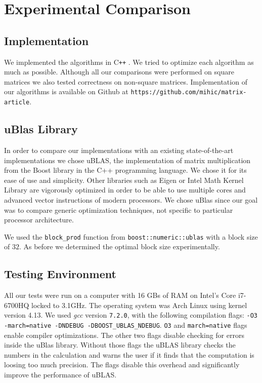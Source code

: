 \documentclass[a4paper,11pt]{article}
\newcommand{\cpp}{C\texttt{++} }
\begin{document}
\section{Experimental Comparison}

\subsection{Implementation}
We implemented the algorithms in \cpp. We tried to optimize each algorithm as much as possible. Although all our comparisons were performed on square matrices we also tested correctness on non-square matrices. Implementation of our algorithms is available on Github at \texttt{https://github.com/mihic/matrix-article}.

\subsection{uBlas Library}
In order to compare our implementations with an existing state-of-the-art implementations we chose uBLAS, the implementation of matrix multiplication from the Boost library in the C++ programming language. We chose it for its ease of use and simplicity. Other libraries such as Eigen \cite{eigen} or Intel Math Kernel Library \cite{mkl} are vigorously optimized in order to be able to use multiple cores and advanced vector instructions of modern processors. We chose uBlas since our goal was to compare generic optimization techniques, not specific to particular processor architecture.

We used the \texttt{block\_prod} function from \texttt{boost::numeric::ublas} with a block size of $32$. As before we determined the optimal block size experimentally.


\subsection{Testing Environment}
All our tests were run on a computer with 16 GBs of RAM on Intel's Core i7-6700HQ locked to 3.1GHz. The operating system was Arch Linux using kernel version 4.13. We used \textit{gcc} version \texttt{7.2.0}, with the following compilation flags: \texttt{-O3 -march=native -DNDEBUG -DBOOST\_UBLAS\_NDEBUG}. \texttt{O3} and \texttt{march=native} flags enable compiler optimizations. The other two flags disable checking for errors inside the uBlas library. Without those flags the uBLAS library checks the numbers in the calculation and warns the user if it finds that the computation is loosing too much precision. The flags disable this overhead and significantly improve the performance of uBLAS. 
\end{document}
